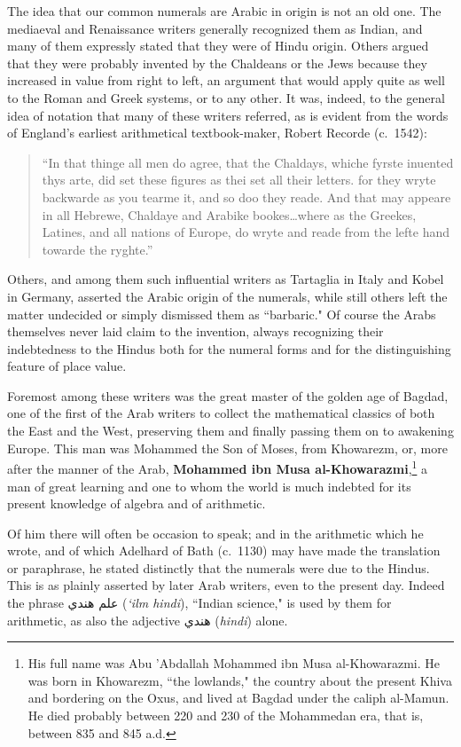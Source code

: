 \documentclass[11pt,a4paper]{article}
\newcommand{\ar}[1]{{\arabicfont #1}}
\begin{document}
The idea that our common numerals are Arabic in origin is not an old one. The mediaeval and Renaissance writers generally recognized them as Indian, and many of them expressly stated that they were of Hindu origin. Others argued that they were probably invented by the Chaldeans or the Jews because they increased in value from right to left, an argument that would apply quite as well to the Roman and Greek systems, or to any other. It was, indeed, to the general idea of notation that many of these writers referred, as is evident from the words of England's earliest arithmetical textbook-maker, Robert Recorde (c.~1542):

\begin{quote}
``In that thinge all men do agree, that the Chaldays, whiche fyrste inuented thys arte, did set these figures as thei set all their letters. for they wryte backwarde as you tearme it, and so doo they reade. And that may appeare in all Hebrewe, Chaldaye and Arabike bookes\ldots where as the Greekes, Latines, and all nations of Europe, do wryte and reade from the lefte hand towarde the ryghte.''
\end{quote}

Others, and among them such influential writers as Tartaglia in Italy and Kobel in Germany, asserted the Arabic origin of the numerals, while still others left the matter undecided or simply dismissed them as ``barbaric." Of course the Arabs themselves never laid claim to the invention, always recognizing their indebtedness to the Hindus both for the numeral forms and for the distinguishing feature of place value.

Foremost among these writers was the great master of the golden age of Bagdad, one of the first of the Arab writers to collect the mathematical classics of both the East and the West, preserving them and finally passing them on to awakening Europe. This man was Mohammed the Son of Moses, from Khowarezm, or, more after the manner of the Arab, \textbf{Mohammed ibn Musa al-Khowarazmi},\footnote{His full name was Abu 'Abdallah Mohammed ibn Musa al-Khowarazmi. He was born in Khowarezm, ``the lowlands," the country about the present Khiva and bordering on the Oxus, and lived at Bagdad under the caliph al-Mamun. He died probably between 220 and 230 of the Mohammedan era, that is, between 835 and 845 a.d.} a man of great learning and one to whom the world is much indebted for its present knowledge of algebra and of arithmetic.

Of him there will often be occasion to speak; and in the arithmetic which he wrote, and of which Adelhard of Bath (c.~1130) may have made the translation or paraphrase, he stated distinctly that the numerals were due to the Hindus. This is as plainly asserted by later Arab writers, even to the present day. Indeed the phrase \ar{علم هندي} (\textit{`ilm hindi}), ``Indian science," is used by them for arithmetic, as also the adjective \ar{هندي} (\textit{hindi}) alone.
\end{document}
